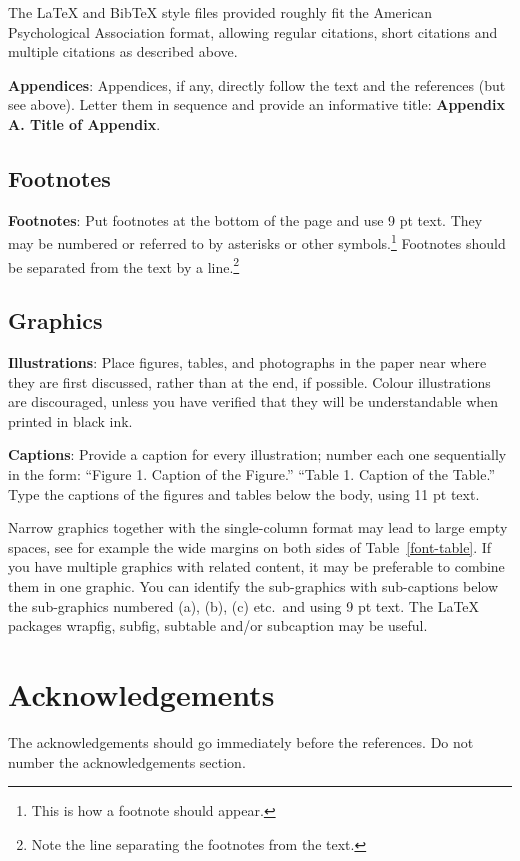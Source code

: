 \documentclass[11pt]{article}
\begin{document}
The \LaTeX{} and Bib\TeX{} style files provided roughly fit the
American Psychological Association format, allowing regular citations, 
short citations and multiple citations as described above.

{\bf Appendices}: Appendices, if any, directly follow the text and the
references (but see above).  Letter them in sequence and provide an
informative title: {\bf Appendix A. Title of Appendix}.

\subsection{Footnotes}

{\bf Footnotes}: Put footnotes at the bottom of the page and use 9 pt
text. They may be numbered or referred to by asterisks or other
symbols.\footnote{This is how a footnote should appear.} Footnotes
should be separated from the text by a line.\footnote{Note the line
separating the footnotes from the text.}

\subsection{Graphics}

{\bf Illustrations}: Place figures, tables, and photographs in the
paper near where they are first discussed, rather than at the end, if
possible. 
Colour illustrations are discouraged, unless you have verified that  
they will be understandable when printed in black ink.

{\bf Captions}: Provide a caption for every illustration; number each one
sequentially in the form:  ``Figure 1. Caption of the Figure.'' ``Table 1.
Caption of the Table.''  Type the captions of the figures and 
tables below the body, using 11 pt text.

Narrow graphics together with the single-column format may lead to
large empty spaces,
see for example the wide margins on both sides of Table~\ref{font-table}.
If you have multiple graphics with related content, it may be
preferable to combine them in one graphic.
You can identify the sub-graphics with sub-captions below the
sub-graphics numbered (a), (b), (c) etc.\ and using 9 pt text.
The \LaTeX{} packages wrapfig, subfig, subtable and/or subcaption
may be useful.

\section*{Acknowledgements}

The acknowledgements should go immediately before the references.  Do
not number the acknowledgements section.



\end{document}
